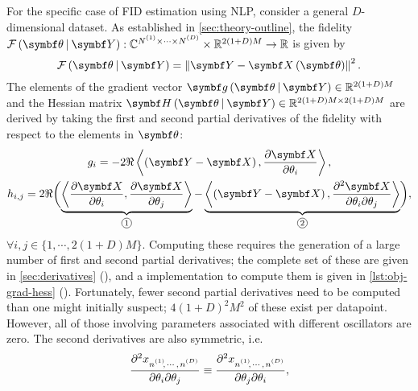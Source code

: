 For the specific case of \ac{FID} estimation using \ac{NLP}, consider a general
$D$-dimensional dataset. As established in \cref{sec:theory-outline}, the
fidelity $\FthY : \mathbb{C}^{\None \times \cdots \times \ND} \times
\mathbb{R}^{2(1 + D)M} \rightarrow \mathbb{R}$ is given by
\begin{equation}
    \FthY = \left \lVert \bY - \bXth \right \rVert^2.
    \label{eq:fidelity}
\end{equation}
The elements of the gradient vector $\bdgthY \in \mathbb{R}^{2(1+D)M}$ and
the Hessian matrix $\bdHthY \in \mathbb{R}^{2(1+D)M \times 2(1+D)M}$ are
derived by taking the first and second partial derivatives of the fidelity with
respect to the elements in $\bth$:
\begin{subequations}
    \begin{gather}
        g_i = -2 \Re
                \left\langle
                    \left(\bY - \bX\right),
                    \frac{\partial \bX}{\partial \theta_i}
                \right\rangle,
        \label{eq:grad} \\
        h_{i,j} = 2 \Re
            \biggl(
                \underbrace{
                    \left\langle
                        \frac{\partial \bX}{\partial \theta_i},
                        \frac{\partial \bX}{\partial \theta_j}
                    \right\rangle
                }_{\circled{1}}
                -
                \underbrace{
                    \left\langle
                        \left(\bY - \bX\right),
                        \frac{\partial^2 \bX}{\partial \theta_i \partial \theta_j}
                    \right\rangle
                }_{\circled{2}}
            \biggl),
            \label{eq:hess}
    \end{gather}
    \label{eq:fidelity-grad-hess}%
\end{subequations}
$\forall i,j \in \lbrace 1, \cdots, 2(1+D)M \rbrace$.
Computing these requires the generation of a large number of first and second
partial derivatives; the complete set of these are given in
\cref{sec:derivatives} (), and a \Python
implementation to compute them is given
in \cref{lst:obj-grad-hess} ().
Fortunately, fewer second partial derivatives need to be computed than one
might initially suspect; $4(1 + D)^2 M^2$ of these exist per datapoint.
However, all of those involving parameters associated with different
oscillators are zero. The second derivatives are also symmetric, i.e.
\[
    \frac{\partial^2 x_{\nonedotsnD}}{\partial \theta_i \partial \theta_j} \equiv
    \frac{\partial^2 x_{\nonedotsnD}}{\partial \theta_j \partial \theta_i},
\]
